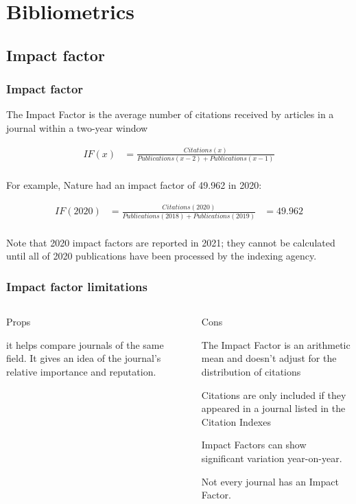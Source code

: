 \documentclass{beamer}
\begin{document}
\section{Bibliometrics}

\subsection{Impact factor}
\begin{frame}
    \frametitle{Impact factor}
    The Impact Factor is the average number of citations received by articles in a journal within a two-year window
    
    \begin{align*}
        IF(x) &= \frac{ Citations(x)}{ Publications(x - 2 ) +  Publications(x - 1) }\\
    \end{align*}

    For example, Nature had an impact factor of 49.962 in 2020:
    
    \begin{align*}
        IF(2020) &= \frac{ Citations(2020)}{ Publications(2018) +  Publications(2019) } &= 49.962\\
    \end{align*}

    Note that 2020 impact factors are reported in 2021; they cannot be calculated until all of 2020
    publications have been processed by the indexing agency.

\end{frame}
\begin{frame}
    \frametitle{Impact factor limitations}
    \begin{columns}[T]
        \begin{column}{.5\textwidth} \pause
            \centering Props
            \begin{propslist}
                \item it helps compare journals of the same field. It gives an idea of the journal’s relative importance and reputation. \pause
            \end{propslist}
        \end{column}
        \begin{column}{.5\textwidth}
            \centering Cons %
            \begin{conslist}
                \item The Impact Factor is an arithmetic mean and doesn’t adjust for the distribution of citations \pause
                \item Citations are only included if they appeared in a journal listed in the Citation Indexes \pause
                \item Impact Factors can show significant variation year-on-year.  \pause
                \item Not every journal has an Impact Factor.  \pause
            \end{conslist}
        \end{column}
    \end{columns}
\end{frame}
\end{document}
